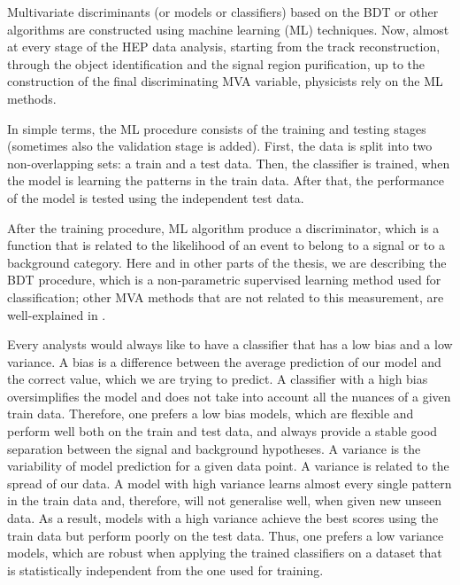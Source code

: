            Multivariate discriminants (or models or classifiers) based on the BDT or other algorithms are constructed using machine learning (ML) techniques. Now, almost at every stage of the HEP data analysis, starting from the track reconstruction, through the object identification and the signal region purification, up to the construction of the final discriminating MVA variable, physicists rely on the ML methods.
           
In simple terms, the ML procedure consists of the training and testing stages (sometimes also the validation stage is added). First, the data is split into two non-overlapping sets: a train and a test data. Then, the classifier is trained, when the model is learning the patterns in the train data. After that, the performance of the model is tested using the independent test data. 

After the training procedure, ML algorithm produce a discriminator, which is a function that is related to the likelihood of an event to belong to a signal or to a background category. Here and in other parts of the thesis, we are describing the BDT procedure, which is a non-parametric supervised learning method used for classification; other MVA methods that are not related to this measurement, are well-explained in \cite{book:411471}. 

Every analysts would always like to have a classifier that has a low bias and a low variance. A bias is a difference between the average prediction of our model and the correct value, which we are trying to predict. A classifier with a high bias oversimplifies the model and does not take into account all the nuances of a given train data. Therefore, one prefers a low bias models, which are flexible and perform well both on the train and test data, and always provide a stable good separation between the signal and background hypotheses. A variance is the variability of model prediction for a given data point. A variance is related to the spread of our data. A model with high variance learns almost every single pattern in the train data and, therefore, will not generalise well, when given new unseen data. As a result, models with a high variance achieve the best scores using the train data but perform poorly on the test data. Thus, one prefers a low variance models, which are robust when applying the trained classifiers on a dataset that is statistically independent from the one used for training.

